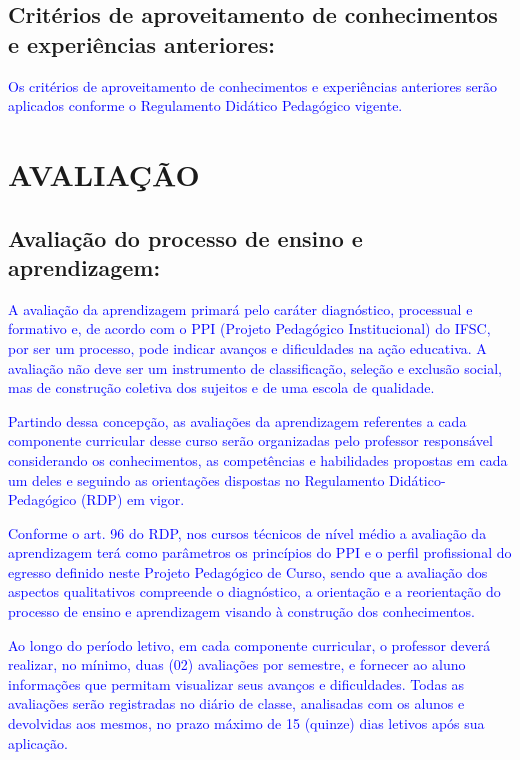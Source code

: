 \documentclass{../../modelos/latex-shared/ifsc-ppc}
\newcommand{\revisao}[1]{\textcolor{blue}{#1}}
\newcommand{\revisao}[1]{#1}
\begin{document}
\subsection{Critérios de aproveitamento de conhecimentos e experiências anteriores:}
\revisao{Os critérios de aproveitamento de conhecimentos e experiências anteriores serão aplicados conforme o Regulamento Didático Pedagógico vigente.}

\section{AVALIAÇÃO}
\subsection{Avaliação do processo de ensino e aprendizagem:}
\revisao{A avaliação da aprendizagem primará pelo caráter diagnóstico, processual e formativo e, de acordo com o PPI (Projeto Pedagógico Institucional) do IFSC, por ser um processo, pode indicar avanços e dificuldades na ação educativa. A avaliação não deve ser um instrumento de classificação, seleção e exclusão social, mas de construção coletiva dos sujeitos e de uma escola de qualidade.}

\revisao{Partindo dessa concepção, as avaliações da aprendizagem referentes a cada componente curricular desse curso serão organizadas pelo professor responsável considerando os conhecimentos, as competências e habilidades propostas em cada um deles e seguindo as orientações dispostas no Regulamento Didático-Pedagógico (RDP) em vigor.}

\revisao{Conforme o art. 96 do RDP, nos cursos técnicos de nível médio a avaliação da aprendizagem terá como parâmetros os princípios do PPI e o perfil profissional do egresso definido neste Projeto Pedagógico de Curso, sendo que a avaliação dos aspectos qualitativos compreende o diagnóstico, a orientação e a reorientação do processo de ensino e aprendizagem visando à construção dos conhecimentos.}

\revisao{Ao longo do período letivo, em cada componente curricular, o professor deverá realizar, no mínimo, duas (02) avaliações por semestre, e fornecer ao aluno informações que permitam visualizar seus avanços e dificuldades. Todas as avaliações serão registradas no diário de classe, analisadas com os alunos e devolvidas aos mesmos, no prazo máximo de 15 (quinze) dias letivos após sua aplicação.}
\end{document}
